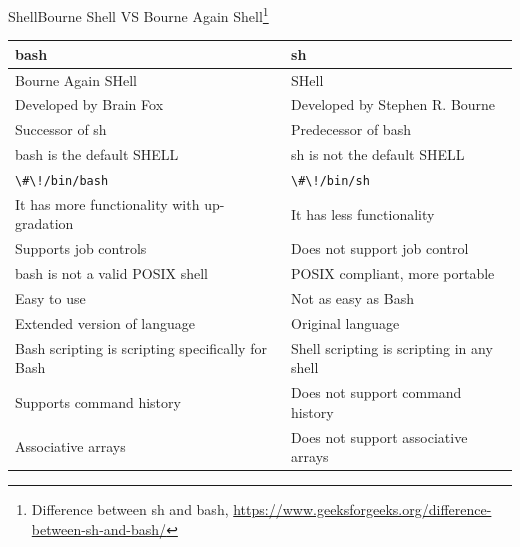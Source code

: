 \documentclass{beamer}
\begin{document}
    \begin{frame}{Shell}{Bourne Shell VS Bourne Again Shell\footnote{Difference between sh and bash, \url{https://www.geeksforgeeks.org/difference-between-sh-and-bash/}}}
        \begin{footnotesize}
            \begin{table}[h!]
                \centering
                \begin{tabular}{|p{5.5cm}|p{5.5cm}|}
                    \hline
                    \textbf{bash}                                     & \textbf{sh}                               \\ \hline
                    Bourne Again SHell                                & SHell                                     \\ \hline
                    Developed by Brain Fox                            & Developed by Stephen R. Bourne            \\ \hline
                    Successor of sh                                   & Predecessor of bash                       \\ \hline
                    bash is the default SHELL                         & sh is not the default SHELL               \\ \hline
                    \lstinline{\#\!/bin/bash}                         & \lstinline{\#\!/bin/sh}                   \\ \hline
                    It has more functionality with up-gradation       & It has less functionality                 \\ \hline
                    Supports job controls                             & Does not support job control              \\ \hline
                    bash is not a valid POSIX shell                   & POSIX compliant, more portable            \\ \hline
                    Easy to use                                       & Not as easy as Bash                       \\ \hline
                    Extended version of language                      & Original language                         \\ \hline
                    Bash scripting is scripting specifically for Bash & Shell scripting is scripting in any shell \\ \hline
                    Supports command history                          & Does not support command history          \\ \hline
                    Associative arrays                                & Does not support associative arrays       \\ \hline
                \end{tabular}
            \end{table}
        \end{footnotesize}
    \end{frame}
\end{document}
